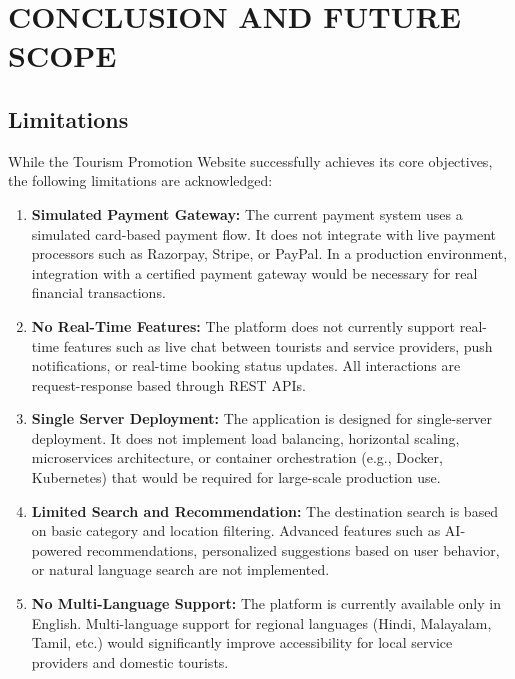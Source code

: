 \chapter{CONCLUSION AND FUTURE SCOPE}

\section{Limitations}

While the Tourism Promotion Website successfully achieves its core objectives, the following limitations are acknowledged:

\begin{enumerate}[leftmargin=2em]
    \item \textbf{Simulated Payment Gateway:} The current payment system uses a simulated card-based payment flow. It does not integrate with live payment processors such as Razorpay, Stripe, or PayPal. In a production environment, integration with a certified payment gateway would be necessary for real financial transactions.

    \item \textbf{No Real-Time Features:} The platform does not currently support real-time features such as live chat between tourists and service providers, push notifications, or real-time booking status updates. All interactions are request-response based through REST APIs.

    \item \textbf{Single Server Deployment:} The application is designed for single-server deployment. It does not implement load balancing, horizontal scaling, microservices architecture, or container orchestration (e.g., Docker, Kubernetes) that would be required for large-scale production use.

    \item \textbf{Limited Search and Recommendation:} The destination search is based on basic category and location filtering. Advanced features such as AI-powered recommendations, personalized suggestions based on user behavior, or natural language search are not implemented.

    \item \textbf{No Multi-Language Support:} The platform is currently available only in English. Multi-language support for regional languages (Hindi, Malayalam, Tamil, etc.) would significantly improve accessibility for local service providers and domestic tourists.


\end{enumerate}
